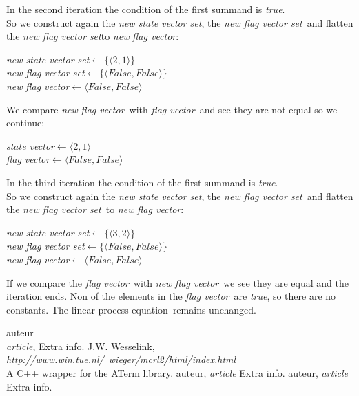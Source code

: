 \documentclass[a4paper,10pt]{article}
\newcommand{\lpe}{linear process equation}
\newcommand{\ti}{\textit}
\newcommand{\sv}{\textit{state vector}}
\newcommand{\fv}{\textit{flag vector}}
\newcommand{\svs}{\textit{new state vector set}}
\newcommand{\fvs}{\textit{new flag vector set}}
\newcommand{\la}{$\leftarrow$}
\begin{document}
In the second iteration the condition of the first summand is \ti{true}.\\
So we construct again the \svs, the \fvs\ and flatten the \fvs to \ti{new} \fv: 
\begin{center}\begin{minipage}{250pt}
\svs \la  $\lbrace \langle 2 , 1 \rangle \rbrace $\\
\fvs \la  $\lbrace \langle False , False \rangle \rbrace $\\
\ti{new} \fv \la  $\langle False , False \rangle $ \\
\end{minipage}\end{center}

We compare \ti{new} \fv\ with \fv\ and see they are not equal so we continue:
\begin{center}\begin{minipage}{250pt}
\sv \la $\langle 2 , 1 \rangle $\\
\fv \la $\langle False , False \rangle $\\
\end{minipage}\end{center}

In the third iteration the condition of the first summand is \ti{true}.\\
So we construct again the \svs, the \fvs\ and flatten the \fvs\ to \ti{new} \fv: 
\begin{center}\begin{minipage}{250pt}
\svs \la  $\lbrace \langle 3 , 2 \rangle \rbrace $\\
\fvs \la  $\lbrace \langle False , False \rangle \rbrace $\\
\ti{new} \fv \la  $\langle False , False \rangle $ \\
\end{minipage}\end{center}

If we compare the \fv\ with \ti{new} \fv\ we see they are equal and the iteration ends.
Non of the elements in the \fv\ are \ti{true}, so there are no constants. The \lpe\ remains unchanged.


\newpage
\begin{thebibliography}{99}   auteur\\
   \textit{article},
   Extra info.
   J.W. Wesselink,
   \textit{http://www.win.tue.nl/~wieger/mcrl2/html/index.html}\\
   A C++ wrapper for the ATerm library.
   auteur,
   \textit{article}
   Extra info.
   auteur,
   \textit{article}
   Extra info.

\end{thebibliography}

\newpage
\end{document}
